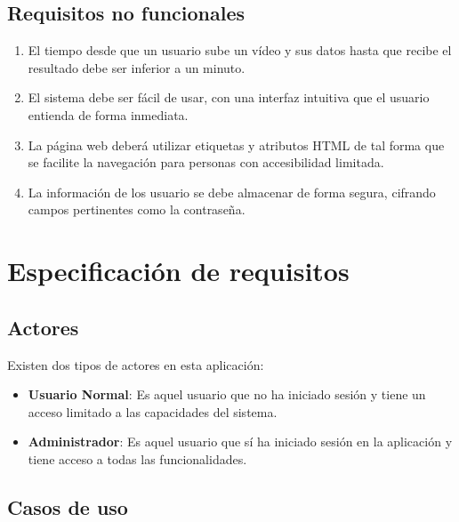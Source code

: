 \subsection{Requisitos no funcionales}

\begin{enumerate}[start=1,label={\bfseries RNF\arabic*:}]
    \item El tiempo desde que un usuario sube un vídeo y sus datos hasta que
          recibe el resultado debe ser inferior a un minuto.
    \item El sistema debe ser fácil de usar, con una interfaz intuitiva que el
          usuario entienda de forma inmediata.
    \item La página web deberá utilizar etiquetas y atributos HTML de tal forma
          que se facilite la navegación para personas con accesibilidad
          limitada.
    \item La información de los usuario se debe almacenar de forma segura,
          cifrando campos pertinentes como la contraseña.
\end{enumerate}

\section{Especificación de requisitos}



\subsection{Actores}

Existen dos tipos de actores en esta aplicación:

\begin{itemize}
    \item \textbf{Usuario Normal}: Es aquel usuario que no ha iniciado sesión y
          tiene un acceso limitado a las capacidades del sistema.
    \item \textbf{Administrador}: Es aquel usuario que sí ha iniciado sesión en
          la aplicación y tiene acceso a todas las funcionalidades.
\end{itemize}

\subsection{Casos de uso}


